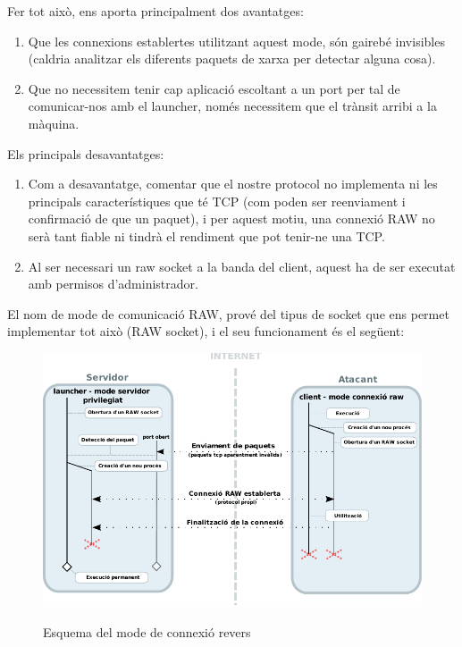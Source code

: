 Fer tot això, ens aporta principalment dos avantatges: \\

\begin{enumerate}
    \item Que les connexions establertes utilitzant aquest mode, són gairebé invisibles (caldria analitzar els
        diferents paquets de xarxa per detectar alguna cosa).
    \item Que no necessitem tenir cap aplicació escoltant a un port per tal de comunicar-nos amb el launcher, només
        necessitem que el trànsit arribi a la màquina.
\end{enumerate}

Els principals desavantatges: \\
\begin{enumerate}
    \item Com a desavantatge, comentar que el nostre protocol no implementa ni les principals característiques que té TCP
        (com poden ser reenviament i confirmació de que un paquet), i per aquest motiu, una connexió RAW no serà tant
        fiable ni tindrà el rendiment que pot tenir-ne una TCP. \\
    \item Al ser necessari un raw socket a la banda del client, aquest ha de ser executat amb permisos d'administrador.
\end{enumerate}

El nom de mode de comunicació RAW, prové del tipus de socket que ens permet implementar tot això (RAW socket),
i el seu funcionament és el següent: \\

\begin{figure}[htp]
    \centering
    \includegraphics[scale=1.2,keepaspectratio]{diagrames/solutionDesignPrivilegedServerModeRAW.pdf} \\
    \caption{Esquema del mode de connexió revers}
    \label{fig:modePrivilegedServerRAW}
\end{figure}

